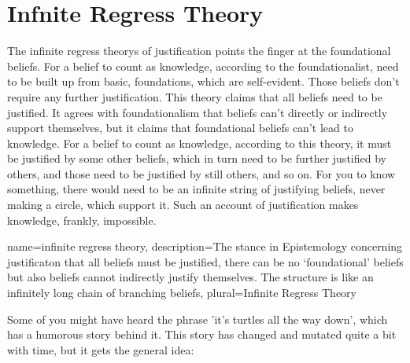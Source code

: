 \section{Infnite Regress Theory}

The \glspl{infinite regress theory} of justification points the finger at the foundational beliefs. For a belief to count as knowledge, according to the foundationalist, need to be built up from basic, foundations, which are self-evident. Those beliefs don't require any further justification. This theory claims that all beliefs need to be justified. It agrees with foundationalism that beliefs can't directly or indirectly support themselves, but it claims that foundational beliefs can't lead to knowledge. For a belief to count as knowledge, according to this theory, it must be justified by some other beliefs, which in turn need to be further justified by others, and those need to be justified by still others, and so on. For you to know something, there would need to be an infinite string of justifying beliefs, never making a circle, which support it. Such an account of justification makes knowledge, frankly, impossible.

{
name=infinite regress theory,
description={The stance in Epistemology concerning justificaton that all beliefs must be justified, there can be no `foundational' beliefs but also beliefs cannot indirectly justify themselves. The structure is like an infinitely long chain of branching beliefs},
plural=Infinite Regress Theory
}


Some of you might have heard the phrase 'it's turtles all the way down', which has a humorous story behind it.  This story has changed and mutated quite a bit with time, but it gets the general idea:


